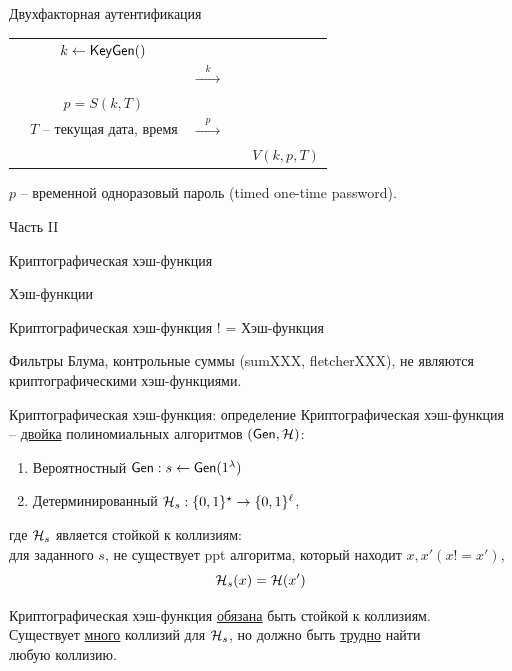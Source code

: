 \documentclass[usenames,dvipsnames,8pt,aspectratio=169]{beamer}
\begin{document}
\begin{frame}{Двухфакторная аутентификация}
\begin{tabular}{c c c c c}
		&  $k \leftarrow \textsf{KeyGen}()$ &  & &  \\
		&  &  $\xrightarrow{ \quad k \quad}$ & &  \\[10pt]
		&  $p = S(k, T)$ &  & &  \\
		& {\small $T$ -- текущая дата, время} & $\xrightarrow{ \quad p \quad}$   & &  \\
		& &  &  & $V(k, p, T)$ \\
	\end{tabular}

\vspace{10pt}
$p$ -- временной одноразовый пароль (timed one-time password).

\end{frame}

\begin{frame}
Часть II \\ [10pt]
\begin{LARGE}
	
	\color{Orange}
	\Huge Криптографическая хэш-функция
	
\end{LARGE}
\end{frame}

\begin{frame}{Хэш-функции}

\Large
\begin{center}
	{\color{Orange} Криптографическая хэш-функция ! = Хэш-функция} \\[10pt]
\end{center}

Фильтры Блума, контрольные суммы (sumXXX, fletcherXXX),  не являются криптографическими хэш-функциями.


\end{frame}

\begin{frame}{Криптографическая хэш-функция: определение}
\Large
{\color{Orange}Криптографическая хэш-функция} -- \underline{двойка} полиномиальных алгоритмов $(\textsf{Gen}, \mathcal{H})$:
\begin{enumerate}
\itemsep 7pt
\item Вероятностный $\textsf{Gen}: s \leftarrow \textsf{Gen}(1^\lambda)$  
\item Детерминированный $\mathcal{H}_s: \{0,1\}^\star \rightarrow \{0,1\}^\ell$,
\end{enumerate}

где $\mathcal{H}_s$ является  {\color{Orange} стойкой к коллизиям}: \\[5pt]

для заданного $s$,  не существует ppt алгоритма, который находит $x, x' (x!=x')$,
\[
\mathcal{H}_s(x) = \mathcal{H}(x')
\]

{\color{Orange} Криптографическая} хэш-функция \underline{обязана} быть стойкой к коллизиям.\\[5pt]

Существует  \underline{много} коллизий для $\mathcal{H}_s$, но должно быть \underline{трудно} найти \\ любую коллизию.
\end{frame}
\end{document}

